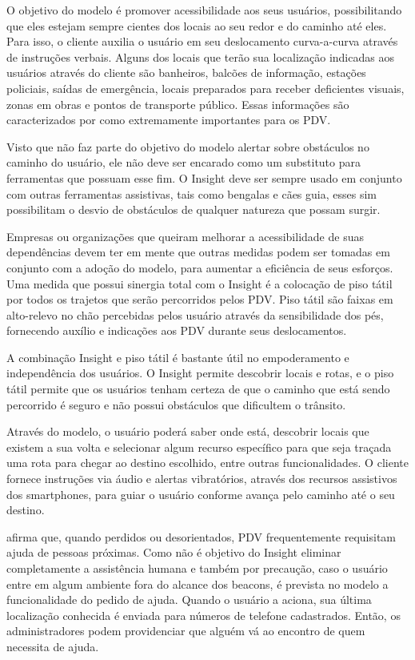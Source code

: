 \documentclass[twoside,english,brazilian]{UNISINOSartigo}
\begin{document}
O objetivo do modelo é promover acessibilidade aos seus usuários, possibilitando que eles estejam sempre cientes dos locais ao seu redor e do caminho até eles. Para isso, o cliente auxilia o usuário em seu deslocamento curva-a-curva através de instruções verbais. Alguns dos locais que terão sua localização indicadas aos usuários através do cliente são banheiros, balcões de informação, estações policiais, saídas de emergência, locais preparados para receber deficientes visuais, zonas em obras e pontos de transporte público. Essas informações são caracterizados por  como extremamente importantes para os PDV.

Visto que não faz parte do objetivo do modelo alertar sobre obstáculos no caminho do usuário, ele não deve ser encarado como um substituto para ferramentas que possuam esse fim. O Insight deve ser sempre usado em conjunto com outras ferramentas assistivas, tais como bengalas e cães guia, esses sim possibilitam o desvio de obstáculos de qualquer natureza que possam surgir. 

Empresas ou organizações que queiram melhorar a acessibilidade de suas dependências devem ter em mente que outras medidas podem ser tomadas em conjunto com a adoção do modelo, para aumentar a eficiência de seus esforços. Uma medida que possui sinergia total com o Insight é a colocação de piso tátil por todos os trajetos que serão percorridos pelos PDV. Piso tátil são faixas em alto-relevo no chão percebidas pelos usuário através da sensibilidade dos pés, fornecendo auxílio e indicações aos PDV durante seus deslocamentos.

A combinação Insight e piso tátil é bastante útil no empoderamento e independência dos usuários. O Insight permite descobrir locais e rotas, e o piso tátil permite que os usuários tenham certeza de que o caminho que está sendo percorrido é seguro e não possui obstáculos que dificultem o trânsito.

Através do modelo, o usuário poderá saber onde está, descobrir locais que existem a sua volta e selecionar algum recurso específico para que seja traçada uma rota para chegar ao destino escolhido, entre outras funcionalidades. O cliente fornece instruções via áudio e alertas vibratórios, através dos recursos assistivos dos smartphones, para guiar o usuário conforme avança pelo caminho até o seu destino.

 afirma que, quando perdidos ou desorientados, PDV frequentemente requisitam ajuda de pessoas próximas. Como não é objetivo do Insight eliminar completamente a assistência humana e também por precaução, caso o usuário entre em algum ambiente fora do alcance dos beacons, é prevista no modelo a funcionalidade do pedido de ajuda. Quando o usuário a aciona, sua última localização conhecida é enviada para números de telefone cadastrados. Então, os administradores podem providenciar que alguém vá ao encontro de quem necessita de ajuda.
\end{document}

